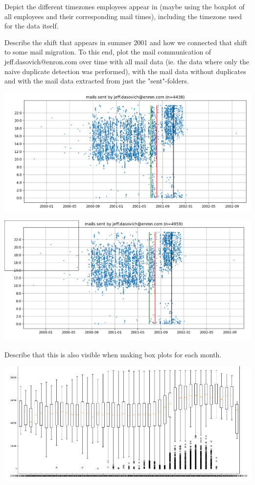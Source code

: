 \documentclass{article}
\begin{document}
Depict the different timezones employees appear in (maybe using the boxplot of
all employees and their corresponding mail times), including the timezone used
for the data itself.

Describe the shift that appears in summer 2001
and how we connected that shift to some mail migration. To this end, plot the
mail communication of jeff.dasovich@enron.com over time with all mail data (ie.
the data where only the naive duplicate detection was performed), with the mail
data without duplicates and with the mail data extracted from just the
"sent"-folders.

\begin{center}
  \includegraphics[width=0.7\linewidth]{tmp/plot_jeff_all.png}
\end{center}
\begin{center}
  \includegraphics[width=0.7\linewidth]{tmp/plot_jeff_stripped.png}
\end{center}

Describe that this is also visible when making box plots for each month.
\begin{center}
  \includegraphics[width=0.7\linewidth]{tmp/boxplot_all.png}
\end{center}
\end{document}
